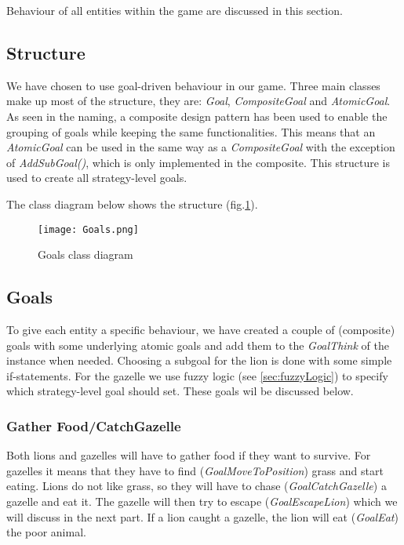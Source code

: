 Behaviour of all entities within the game are discussed in this section.

\subsection{Structure}\label{subsec:behaviourStructure}
We have chosen to use goal-driven behaviour in our game.
Three main classes make up most of the structure, they are: \textit{Goal}, \textit{CompositeGoal} and \textit{AtomicGoal}.
As seen in the naming, a composite design pattern has been used to enable the grouping of goals while keeping the same functionalities.
This means that an \textit{AtomicGoal} can be used in the same way as a \textit{CompositeGoal} with the exception of \textit{AddSubGoal()},
which is only implemented in the composite.
This structure is used to create all strategy-level goals.

The class diagram below shows the structure (fig.\ref{fig:behaviourClassDiagram}).

\begin{figure}[h!]
    \begin{center}
        \texttt{[image: Goals.png]}
    \end{center}
    \caption{Goals class diagram}
    \label{fig:behaviourClassDiagram}
\end{figure}

\newpage
\subsection{Goals}\label{subsec:behaviourGoals}
To give each entity a specific behaviour, we have created a couple of (composite) goals with some underlying atomic goals
and add them to the \textit{GoalThink} of the instance when needed.
Choosing a subgoal for the lion is done with some simple if-statements.
For the gazelle we use fuzzy logic (see \ref{sec:fuzzyLogic}) to specify which strategy-level goal should set.
These goals wil be discussed below.

\subsubsection{Gather Food/CatchGazelle}\label{sec:behaviourFood}
Both lions and gazelles will have to gather food if they want to survive.
For gazelles it means that they have to find (\textit{GoalMoveToPosition}) grass and start eating.
Lions do not like grass, so they will have to chase (\textit{GoalCatchGazelle}) a gazelle and eat it.
The gazelle will then try to escape (\textit{GoalEscapeLion}) which we will discuss in the next part.
If a lion caught a gazelle, the lion will eat (\textit{GoalEat}) the poor animal.

